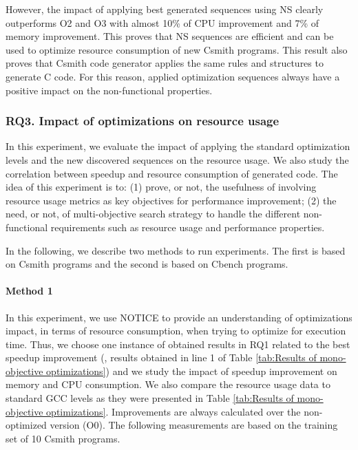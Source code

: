 However, the impact of applying best generated sequences using NS clearly outperforms O2 and O3 with almost 10\% of CPU improvement and 7\% of memory improvement. 
This proves that NS sequences are efficient and can be used to optimize resource consumption of new Csmith programs. This result also proves that Csmith code generator applies the same rules and structures to generate C code. For this reason, applied optimization sequences always have a positive impact on the non-functional properties.

\noindent{}


\subsubsection{RQ3. Impact of optimizations on resource usage}
In this experiment, we evaluate the impact of applying the standard optimization levels and the new discovered sequences on the resource usage. We also study the correlation between speedup and resource consumption of generated code. 
The idea of this experiment is to: (1) prove, or not, the usefulness of involving resource usage metrics as key objectives for performance improvement; (2) the need, or not, of multi-objective search strategy to handle the different non-functional requirements such as resource usage and performance properties.

In the following, we describe two methods to run experiments. The first is based on Csmith programs and the second is based on Cbench programs.

\paragraph{Method 1}

In this experiment, we use NOTICE to provide an understanding of optimizations impact, in terms of resource consumption, when trying to optimize for execution time. 
Thus, we choose one instance of obtained results in RQ1 related to the best speedup improvement (\ie, results obtained in line 1 of Table \ref{tab:Results of mono-objective optimizations}) and we study the impact of speedup improvement on memory and CPU consumption. We also compare the resource usage data to standard GCC levels as they were presented in Table \ref{tab:Results of mono-objective optimizations}. Improvements are always calculated over the non-optimized version (O0). The following measurements are based on the training set of 10 Csmith programs.

